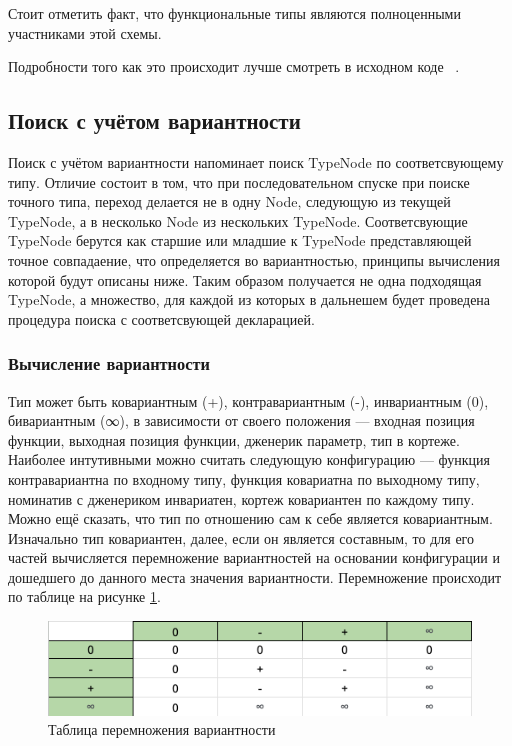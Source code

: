 \documentclass[times]{itmo-student-thesis}
\begin{document}
	Стоит отметить факт, что функциональные типы являются полноценными участниками этой схемы.
		
	Подробности того как это происходит лучше смотреть в исходном коде ~\cite{sourcecode}.
	
	\subsection{Поиск с учётом вариантности}
	Поиск с учётом вариантности напоминает поиск TypeNode по соответсвующему типу. Отличие состоит в том, что при последовательном спуске при поиске точного типа, переход делается не в одну Node, следующую из текущей TypeNode, а в несколько Node из нескольких TypeNode. Соответсвующие TypeNode берутся как старшие или младшие к TypeNode представляющей точное совпадаение, что определяется во вариантностью, принципы вычисления которой будут описаны ниже. Таким образом получается не одна подходящая TypeNode, а множество, для каждой из которых в дальнешем будет проведена процедура поиска с соответсвующей декларацией. 
	
	\subsubsection{Вычисление вариантности}
	Тип может быть ковариантным (+), контравариантным (-), инвариантным (0), бивариантным (∞), в зависимости от своего положения --- входная позиция функции, выходная позиция функции, дженерик параметр, тип в кортеже. Наиболее интутивными можно считать следующую конфигурацию --- функция контравариантна по входному типу, функция ковариатна по выходному типу, номинатив с дженериком инвариатен, кортеж ковариантен по каждому типу. Можно ещё сказать, что тип по отношению сам к себе является ковариантным. Изначально тип ковариантен, далее, если он является составным, то для его частей вычисляется перемножение вариантностей на основании конфигурации и дошедшего до данного места значения вариантности. Перемножение происходит по таблице на рисунке \ref{variancemultiplication}. 
	
	\begin{figure}[!h]
		\caption{Таблица перемножения вариантности} \label{variancemultiplication}
		\centering
		\includegraphics[width=0.8\columnwidth]{images/variancemultiplication.png}
	\end{figure}
	
\end{document}
